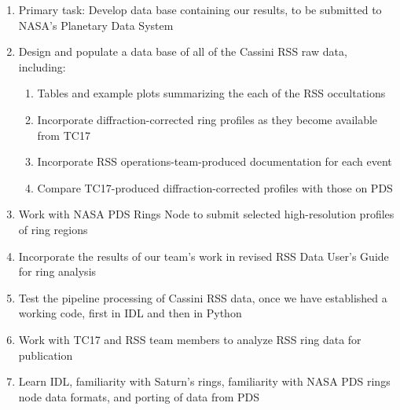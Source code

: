 \documentclass[crop=false,class=book]{standalone}
\begin{document}
\begin{enumerate}
    \item Primary task: Develop data base containing our results, to be submitted to NASA's Planetary Data System
    \item Design and populate a data base of all of the Cassini RSS raw data, including:
    \begin{enumerate}
        \item Tables and example plots summarizing the each of the RSS occultations
        \item Incorporate diffraction-corrected ring profiles as they become available from TC17
        \item Incorporate RSS operations-team-produced documentation for each event
        \item Compare TC17-produced diffraction-corrected profiles with those on PDS
    \end{enumerate}
    \item Work with NASA PDS Rings Node to submit selected high-resolution profiles of ring regions
    \item Incorporate the results of our team's work in revised RSS Data User's Guide for ring analysis
    \item Test the pipeline processing of Cassini RSS data, once we have established a working code, first in IDL and then in Python
    \item Work with TC17 and RSS team members to analyze RSS ring data for publication
    \item Learn IDL, familiarity with Saturn's rings, familiarity with NASA PDS rings node data formats, and porting of data from PDS
\end{enumerate}
\end{document}
